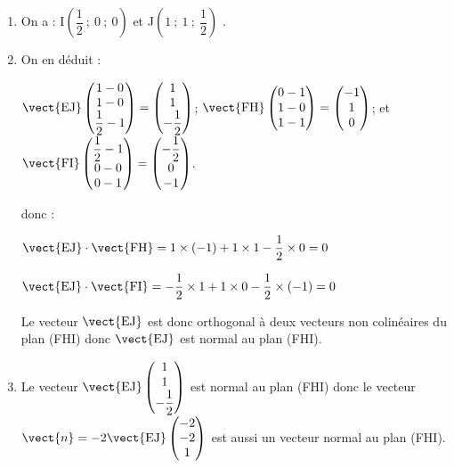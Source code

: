 \medskip


\begin{enumerate}
	\item

	On a : I$\left(\dfrac{1}{2}~;~ 0~;~0 \right)$  et J$\left(1~;~1~;~\dfrac{1}{2} \right)$ .

	\item

	On en déduit :

	$\vect{\text{EJ}} \begin{pmatrix}1-0  \\ 1- 0 \\ \dfrac{1}{2}-1     \end{pmatrix} =  \begin{pmatrix}1 \\ 1 \\ -\dfrac{1}{2}\end{pmatrix}$;
	\qquad
	$\vect{\text{FH}} \begin{pmatrix}0-1   \\ 1-0 \\ 1- 1   \end{pmatrix} =  \begin{pmatrix}-1 \\ 1 \\ 0\end{pmatrix}$;
	\quad	et \quad $\vect{\text{FI}} \begin{pmatrix}\dfrac{1}{2}-1  \\ 0-0  \\ 0-1   \end{pmatrix} =  \begin{pmatrix}-\dfrac{1}{2} \\ 0 \\ -1    \end{pmatrix}$.


	donc :

	$\vect{\text{EJ}} \cdot \vect{\text{FH}}= 1 \times (-1) + 1\times 1 -\dfrac{1}{2} \times 0 = 0$

	$\vect{\text{EJ}} \cdot \vect{\text{FI}}=  -\dfrac{1}{2} \times 1 + 1\times 0 -\dfrac{1}{2} \times (-1) = 0$

	Le vecteur $\vect{\text{EJ}}$ est donc orthogonal à deux vecteurs non colinéaires du plan (FHI) donc $\vect{\text{EJ}}$ est normal au plan (FHI).

	\item Le vecteur $\vect{\text{EJ}}\begin{pmatrix}1 \\ 1 \\ -\dfrac{1}{2}    \end{pmatrix}$ est normal au plan (FHI) donc le vecteur   $\vect{n}= -2\vect{\text{EJ}}\begin{pmatrix}-2 \\ -2 \\ 1    \end{pmatrix}$ est aussi un vecteur normal au plan (FHI).


\end{enumerate}
